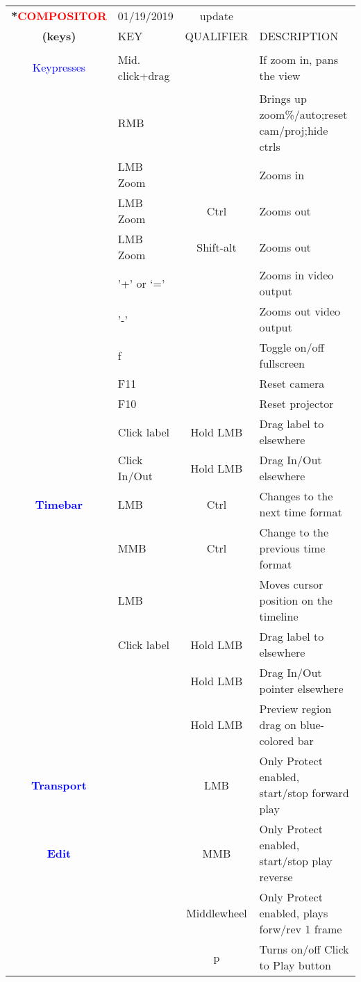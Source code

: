 \begin{center}
    \small 
    \begin{longtable}{ >{\bfseries}c l c p{6cm}}             
        \toprule
        \multirow{2}*{\textcolor{red}{COMPOSITOR}} & 01/19/2019 & update & \\
        \noalign{\smallskip}
        \cline{2-4}
        \noalign{\smallskip}
        (keys) & KEY & QUALIFIER & DESCRIPTION\\
        \midrule        
        \endhead   
        
        \textcolor{blue}{Keypresses} & Mid. click+drag &  & If zoom in, pans the view \\        
        & RMB &  & Brings up zoom\%/auto;reset cam/proj;hide ctrls \\        
        & LMB Zoom &  & Zooms in \\        
        & LMB Zoom & Ctrl & Zooms out \\        
        & LMB Zoom & Shift-alt & Zooms out  \\        
        & '+' or ‘=’ &  & Zooms in video output \\        
        & '-' &  & Zooms out video output \\        
        & f &  & Toggle on/off fullscreen \\        
        & F11 &  & Reset camera \\        
        & F10 &  & Reset projector \\        
        & Click label & Hold LMB & Drag label to elsewhere \\        
        & Click In/Out & Hold LMB & Drag In/Out elsewhere \\
        \midrule
        \textcolor{blue}{Timebar} & LMB & Ctrl & Changes to the next time format \\        
        & MMB & Ctrl & Change to the previous time format \\        
        & LMB &  & Moves cursor position on the timeline \\        
        & Click label & Hold LMB & Drag label to elsewhere \\        
        &  & Hold LMB & Drag In/Out pointer elsewhere \\        
        &  & Hold LMB & Preview region drag on blue-colored bar \\        
        \midrule        
        \textcolor{blue}{Transport} &  & LMB & Only Protect enabled, start/stop forward play \\
        \midrule
        \textcolor{blue}{Edit} &  & MMB & Only Protect enabled, start/stop play reverse \\        
        &  & Middlewheel & Only Protect enabled, plays forw/rev 1 frame \\        
        &  & p & Turns on/off Click to Play button \\
        
        \bottomrule  
    \end{longtable}
\end{center}

